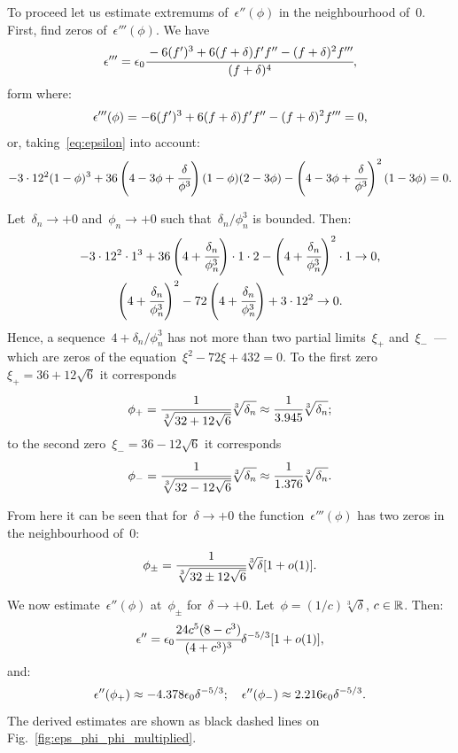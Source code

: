To proceed let us estimate extremums of~$\epsilon''(\phi)$ in the neighbourhood of~$0$.
First, find zeros of~$\epsilon'''(\phi)$. We have
\begin{equation}
	\epsilon''' = \epsilon_0 \cfrac{-6 (f')^3 + 6 (f + \delta) f' f'' - (f + \delta)^2 f'''}{(f + \delta)^4},
	\label{eq:epsilon_phi_phi_phi}
\end{equation}
form where:
$$\epsilon'''(\phi) = -6 (f')^3 + 6 (f + \delta) f' f'' - (f + \delta)^2 f''' = 0 {\text{,}}$$
or, taking~\eqref{eq:epsilon} into account:
$$-3 \cdot 12^2 (1 - \phi)^3 + 36 \left(4 - 3\phi + \cfrac{\delta}{\phi^3} \right)(1 - \phi)(2 - 3\phi) - \left(4 - 3 \phi + \cfrac{\delta}{\phi^3} \right)^2 (1 - 3 \phi) = 0 {\text{.}}$$

Let~$\delta_n \to +0$ and~$\phi_n \to +0$ such that~$\delta_n / \phi_n^3$ is bounded.
Then:
\begin{gather*}
	-3 \cdot 12^2 \cdot 1^3 + 36 \left(4 + \cfrac{\delta_n}{\phi_n^3} \right) \cdot 1 \cdot 2 - \left(4 + \cfrac{\delta_n}{\phi_n^3} \right)^2 \cdot 1 \to 0 {\text{,}} \\
	\left(4 + \cfrac{\delta_n}{\phi_n^3} \right)^2 - 72 \left(4 + \cfrac{\delta_n}{\phi_n^3} \right) + 3 \cdot 12^2 \to 0 {\text{.}}
\end{gather*}
Hence, a sequence~$4 + \delta_n / \phi_n^3$ has not more than two partial limits~$\xi_+$ and~$\xi_-$~---
which are zeros of the equation~$\xi^2 - 72 \xi + 432 = 0$.
To the first zero~$\xi_+ = 36 + 12 \sqrt{6}$ it corresponds
$$\phi_+ = \cfrac{1}{\sqrt[3]{32 + 12 \sqrt{6}}} \sqrt[3]{\delta_n} \approx \cfrac{1}{3.945} \sqrt[3]{\delta_n} {\text{;}}$$
to the second zero~$\xi_- = 36 - 12 \sqrt{6}$ it corresponds
$$\phi_- = \cfrac{1}{\sqrt[3]{32 - 12 \sqrt{6}}} \sqrt[3]{\delta_n} \approx \cfrac{1}{1.376} \sqrt[3]{\delta_n} {\text{.}}$$

From here it can be seen that for~$\delta \to +0$ the function~$\epsilon'''(\phi)$ has two zeros in the neighbourhood of~$0$:
\begin{equation}
  \phi_{\pm} = \cfrac{1}{\sqrt[3]{32 \pm 12 \sqrt{6}}} \sqrt[3]{\delta} [1 + o(1)] {\text{.}}
  \label{eq:epsilon_phi_phi_phi_roots}
\end{equation}

We now estimate~$\epsilon''(\phi)$ at~$\phi_{\pm}$  for~$\delta \to +0$. Let~$\phi = (1 / c) \sqrt[3]{\delta}$, $c \in {\mathbb{R}}$.
Then:
$$\epsilon'' = \epsilon_0 \cfrac{24 c^5 (8 - c^3)}{(4 + c^3)^3} \delta^{-5 / 3} [1 + o(1)],$$
and:
\begin{equation}
  \epsilon''(\phi_+) \approx -4.378 \epsilon_0 \delta^{-5 / 3}; \quad \epsilon''(\phi_-) \approx 2.216 \epsilon_0 \delta^{-5 / 3} {\text{.}}
  \label{est:epsilon_phi_phi_bounds}
\end{equation}
The derived estimates are shown as black dashed lines on Fig.~\ref{fig:eps_phi_phi_multiplied}.

